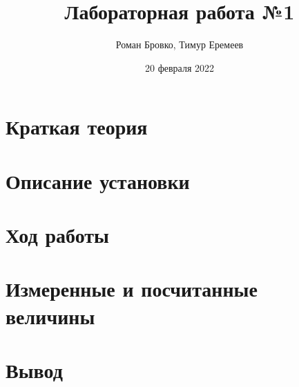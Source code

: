 \documentclass[a4paper, 12pt]{article}
\begin{document}
        \title{Лабораторная работа №1}
	\author{Роман Бровко, Тимур Еремеев}
        \date{20 февраля 2022}

        \maketitle
        
        

        \section*{Краткая теория}
        

        \section*{Описание установки}
        

        \section*{Ход работы}
        

        \section*{Измеренные и посчитанные величины}
        

        \section*{Вывод}
        
\end{document}
